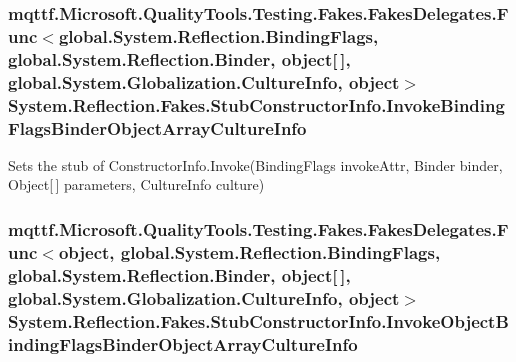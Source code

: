 \hypertarget{class_system_1_1_reflection_1_1_fakes_1_1_stub_constructor_info_a55fff90ebf29c468127a06d5ea95b544}{
\subsubsection[{Invoke\-Binding\-Flags\-Binder\-Object\-Array\-Culture\-Info}]{\setlength{\rightskip}{0pt plus 5cm}mqttf.\-Microsoft.\-Quality\-Tools.\-Testing.\-Fakes.\-Fakes\-Delegates.\-Func$<$global.\-System.\-Reflection.\-Binding\-Flags, global.\-System.\-Reflection.\-Binder, object\mbox{[}$\,$\mbox{]}, global.\-System.\-Globalization.\-Culture\-Info, object$>$ System.\-Reflection.\-Fakes.\-Stub\-Constructor\-Info.\-Invoke\-Binding\-Flags\-Binder\-Object\-Array\-Culture\-Info}}\label{class_system_1_1_reflection_1_1_fakes_1_1_stub_constructor_info_a55fff90ebf29c468127a06d5ea95b544}


Sets the stub of Constructor\-Info.\-Invoke(\-Binding\-Flags invoke\-Attr, Binder binder, Object\mbox{[}$\,$\mbox{]} parameters, Culture\-Info culture)

\hypertarget{class_system_1_1_reflection_1_1_fakes_1_1_stub_constructor_info_a739c56b31cbe11df7168976c80542ca6}{
\subsubsection[{Invoke\-Object\-Binding\-Flags\-Binder\-Object\-Array\-Culture\-Info}]{\setlength{\rightskip}{0pt plus 5cm}mqttf.\-Microsoft.\-Quality\-Tools.\-Testing.\-Fakes.\-Fakes\-Delegates.\-Func$<$object, global.\-System.\-Reflection.\-Binding\-Flags, global.\-System.\-Reflection.\-Binder, object\mbox{[}$\,$\mbox{]}, global.\-System.\-Globalization.\-Culture\-Info, object$>$ System.\-Reflection.\-Fakes.\-Stub\-Constructor\-Info.\-Invoke\-Object\-Binding\-Flags\-Binder\-Object\-Array\-Culture\-Info}}\label{class_system_1_1_reflection_1_1_fakes_1_1_stub_constructor_info_a739c56b31cbe11df7168976c80542ca6}


